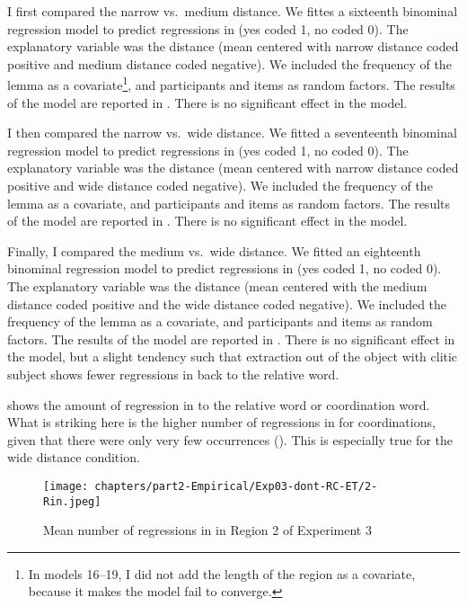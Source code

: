 I first compared the narrow vs.\ medium distance. We fittes a sixteenth binominal regression model to predict regressions in (yes coded 1, no coded 0). The explanatory variable was the distance (mean centered with narrow distance coded positive and medium distance coded negative). We included the frequency of the lemma as a covariate\footnote{In models 16--19, I did not add the length of the region as a covariate, because it makes the model fail to converge.}, and participants and items as random factors. 
The results of the model are reported in . There is no significant effect in the model.


I then compared the narrow vs.\ wide distance. We fitted a seventeenth binominal regression model to predict regressions in (yes coded 1, no coded 0). The explanatory variable was the distance (mean centered with narrow distance coded positive and wide distance coded negative). We included the frequency of the lemma as a covariate, and participants and items as random factors. 
The results of the model are reported in . There is no significant effect in the model.\pagebreak

   


Finally, I compared the medium vs.\ wide distance. We fitted an eighteenth binominal regression model to predict regressions in (yes coded 1, no coded 0). The explanatory variable was the distance (mean centered with the medium distance coded positive and the wide distance coded negative). We included the frequency of the lemma as a covariate, and participants and items as random factors. 
The results of the model are reported in . There is no significant effect in the model, but a slight tendency such that extraction out of the object with clitic subject shows fewer regressions in back to the relative word.



 shows the amount of regression in to the relative word or coordination word. What is striking here is the higher number of regressions in for coordinations, given that there were only very few occurrences (). This is especially true for the wide distance condition.

\begin{figure}
    \centering
    \texttt{[image: chapters/part2-Empirical/Exp03-dont-RC-ET/2-Rin.jpeg]}
    \caption{Mean number of regressions in in Region 2 of Experiment 3}
    \label{fig:exp03-2-Rin}
\end{figure}

